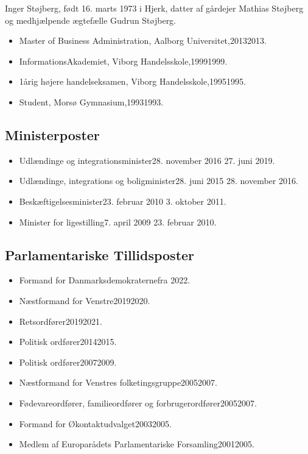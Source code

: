 \documentclass[11pt, a4paper]{awesome-cv}
\begin{document}
\makecvheader[R]
\makelettertitle
\begin{cvletter}
Inger Støjberg, født 16. marts 1973 i Hjerk, datter af gårdejer Mathias Støjberg og medhjælpende ægtefælle Gudrun Støjberg.

\begin{itemize}
\item Master of Business Administration, Aalborg Universitet,20132013.
\item InformationsAkademiet, Viborg Handelsskole,19991999.
\item 1årig højere handelseksamen, Viborg Handelsskole,19951995.
\item Student, Morsø Gymnasium,19931993.
\end{itemize}
\subsection*{Ministerposter}
\begin{itemize}
\item Udlændinge og integrationsminister28. november 2016  27. juni 2019.
\item Udlændinge, integrations og boligminister28. juni 2015  28. november 2016.
\item Beskæftigelsesminister23. februar 2010  3. oktober 2011.
\item Minister for ligestilling7. april 2009  23. februar 2010.
\end{itemize}
\subsection*{Parlamentariske Tillidsposter}
\begin{itemize}
\item Formand for Danmarksdemokraternefra 2022.
\item Næstformand for Venstre20192020.
\item Retsordfører20192021.
\item Politisk ordfører20142015.
\item Politisk ordfører20072009.
\item Næstformand for Venstres folketingsgruppe20052007.
\item Fødevareordfører, familieordfører og forbrugerordfører20052007.
\item Formand for Økontaktudvalget20032005.
\item Medlem af Europarådets Parlamentariske Forsamling20012005.
\end{itemize}

\end{cvletter}
\end{document}
